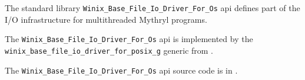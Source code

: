 
The standard library {\tt Winix\_Base\_File\_Io\_Driver\_For\_Os} api defines part of the I/O infrastructure for multithreaded Mythryl programs.

The {\tt Winix\_Base\_File\_Io\_Driver\_For\_Os} api is implemented by 
the {\tt winix\_base\_file\_io\_driver\_for\_posix\_g} generic from 
.

The {\tt Winix\_Base\_File\_Io\_Driver\_For\_Os} api source code is in .






